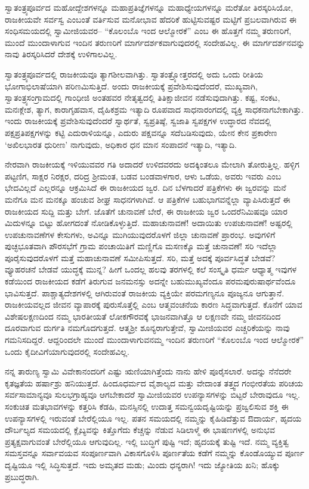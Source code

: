ಸ್ವಾತಂತ್ರ್ಯಪೂರ್ವದ ಮಹೋದ್ದೇಶಗಳನ್ನೂ ಮಹಾಪ್ರತಿಜ್ಞೆಗಳನ್ನೂ ಮಹಾಧ್ಯೇಯಗಳನ್ನೂ ಮರೆತೋ ತಿರಸ್ಕರಿಸಿಯೋ, ರಾಜಕೀಯವೇ ಸರ್ವಸ್ವ ಎಂಬಂತೆ ವರ್ತಿಸುವ ಮನೋಭಾವ ಹೆದರಿಕೆ ಹುಟ್ಟಿಸುವಷ್ಟರ ಮಟ್ಟಿಗೆ ಪ್ರಬಲವಾಗಿರುವ ಈ ಸಂಧಿಸಮಯದಲ್ಲಿ ಸ್ವಾಮೀಜಿಯವರ– “ಕೊಲಂಬೊ ಇಂದ ಆಲ್ಮೋರಕೆ” ಎಂಬ ಈ ಹೊತ್ತಗೆ ನಮ್ಮ ತರುಣರಿಗೆ, ಮುಂದೆ ಮುಂದಾಳಾಗುವ ಇಂದಿನ ತರುಣರಿಗೆ ಮಾರ್ಗದರ್ಶಕವಾಗುವುದರಲ್ಲಿ ಸಂದೇಹವಿಲ್ಲ. ಈ ಮಾರ್ಗದರ್ಶನವನ್ನು ನಾವು ತಿರಸ್ಕರಿಸಿದರೆ ದೇಶಕ್ಕೆ ಉಳಿಗಾಲವಿಲ್ಲ.

ಸ್ವಾತಂತ್ರ್ಯಪೂರ್ವದಲ್ಲಿ ರಾಜಕೀಯವೂ ತ್ಯಾಗಶೀಲವಾಗಿತ್ತು. ಸ್ವಾತಂತ್ರ್ಯೋತ್ತರದಲ್ಲಿ ಅದು ಒಂದು ರೀತಿಯ ಭೋಗಾಭಿಲಾಷೆಯಾಗಿ ಪರಿಣಮಿಸುತ್ತಿದೆ. ಅಂದು ರಾಜಕೀಯಕ್ಕೆ ಪ್ರವೇಶಿಸುವುದೆಂದರೆ, ಮುಖ್ಯವಾಗಿ, ಸ್ವಾತಂತ್ರ್ಯ\break ಸಂಗ್ರಾಮದಲ್ಲಿ ಗಾಂಧೀಜಿ ಅಂತಹವರ ನೇತೃತ್ವದಲ್ಲಿ ತಿತಿಕ್ಷಾಜೀವನ ನಡೆಸುವುದಾಗಿತ್ತು. ಕಷ್ಟ, ಸಂಕಟ, ಮನಃಕ್ಲೇಶ, ತ್ಯಾಗ, ಕಾರಾಗೃಹವಾಸ, ದೈಹಿಕಶ್ರಮ ಇತ್ಯಾದಿ ರೂಪವಾದ ಸಾಧನಾರಂಗದಲ್ಲಿ ವ್ಯಕ್ತಿ ಸಾಧಕನಾಗಬೇಕಾಗಿತ್ತು. ಇಂದು ರಾಜಕೀಯಕ್ಕೆ ಪ್ರವೇಶಿಸುವುದೆಂದರೆ ಸ್ವಾರ್ಥತೆ, ಸ್ವಪ್ರತಿಷ್ಠೆ, ಸ್ವಜಾತಿ ಸ್ವಪಕ್ಷಗಳ ಉದ್ಧಾರದ ನೆವದಲ್ಲಿ ಪಕ್ಷಪ್ರತಿಪಕ್ಷಗಳನ್ನು ಕಟ್ಟಿ ಎದುರಾಳಿಯನ್ನೂ, ಎದುರು ಪಕ್ಷವನ್ನೂ ಸದೆಬಡಿಸುವುದು, ಯೇನ ಕೇನ ಪ್ರಕಾರೇಣ ‘ಅಖಿಲಭಾರತ ಧುರೀಣ’ ನಾಗುವುದು, ಅಧಿಕಾರ ಧನ ಮಾನ ಸಂಪಾದನೆ ಇತ್ಯಾದಿ, ಇತ್ಯಾದಿ.

ನೇರವಾಗಿ ರಾಜಕೀಯಕ್ಕೆ ಇಳಿಯುವವರ ಗತಿ ಅದಾದರೆ ಉಳಿದವರದು ಅದಕ್ಕಿಂತಲೂ ಮೇಲಾಗಿ ತೋರುತ್ತಿಲ್ಲ. ಹಳ್ಳಿಗ ಪಟ್ಟಣಿಗ, ಸಾಕ್ಷರ ನಿರಕ್ಷರ, ದರಿದ್ರ ಶ‍್ರೀಮಂತ, ಬಡವ ಬಂಡವಾಳಗಾರ, ಆಳು ಒಡೆಯ, ಅವರು ಇವರು ಎಂಬ ಭೇದವಿಲ್ಲದೆ ಎಲ್ಲರನ್ನೂ ಆಕ್ರಮಿಸಿದೆ ಈ ರಾಜಕೀಯದ ಜ್ವರ. ದಿನ ಬೆಳಗಾದರೆ ಪತ್ರಿಕೆಗಳು ಈ ಜ್ವರವನ್ನು ಮನೆ ಮನೆಗೂ ಮನ ಮನಕ್ಕೂ ಹಂಚುವ ಶೀಘ್ರ ಸಾಧನಗಳಾಗಿವೆ. ಆ ಪತ್ರಿಕೆಗಳ ಬಹುಭಾಗವನ್ನೆಲ್ಲಾ ವ್ಯಾಪಿಸಿರುತ್ತದೆ ಈ ರಾಜಕೀಯದ ಸುದ್ದಿ ಮತ್ತು ಬೇಗೆ. ಜೊತೆಗೆ ಚುನಾವಣೆ ಬೇರೆ, ಈ ರಾಜಕೀಯ ಜ್ವರ ಒಂದರೆನಿಮಿಷವೂ ಯಾರ ಮಿದುಳನ್ನೂ ಬಿಟ್ಟು ಹೋಗದಂತೆ ನೋಡಿಕೊಳ್ಳುತ್ತಿದೆ. ಮಹಾಚುನಾವಣೆ! ಅದಾಯಿತು ಉಪಚುನಾವಣೆ! ಅಷ್ಟರಲ್ಲಿ ಉಪಚುನಾವಣೆಗಳ ಕೇಸುಗಳು, ಅವಿನ್ನೂ ಮುಗಿಯುವುದರೊಳಗೆ ಜಿಲ್ಲಾ ಚುನಾವಣೆ ಪ್ರಾರಂಭ. ಅವುಗಳಿಗೆ ಪುಚ್ಛಭೂತವಾಗಿ ಪೌರಸಭೆಗೆ ಗ್ರಾಮ ಪಂಚಾಯಿತಿಗೆ ಮಣ್ಣಿಗೊ ಮಸಣಕ್ಕೊ ಮತ್ತೆ ಚುನಾವಣೆ! ಸರಿ ಇದೆಲ್ಲಾ ಪೂರೈಸುವುದರೊಳಗೆ ಮತ್ತೆ ಮಹಾಚುನಾವಣೆ ಸಮೀಪಿಸುತ್ತದೆ. ಸರಿ, ಮತ್ತೆ ಅದಕ್ಕೆ ಪೂರ್ವಸಿದ್ಧತೆ ಬೇಡವೆ? ವ್ಯೂಹರಚನೆ ಬೇಡವೆ ಯುದ್ಧಕ್ಕೆ ಮುನ್ನ? ಹೀಗೆ ಒಂದಲ್ಲ ಹಲವು ತರಗಳಲ್ಲಿ ಕಲೆ ಸಂಸ್ಕೃತಿ ಧರ್ಮ ಆಧ್ಯಾತ್ಮ ಇವುಗಳ ಕಡೆಯಿಂದ ರಾಜಕೀಯದ ಕಡೆಗೆ ತಿರುಗುವ ಜನಮನಸ್ಸು ಅದನ್ನೇ ಬಹುಮುಖ್ಯವೆಂದೂ ಪರಮಪುರುಷಾರ್ಥವೆಂದೂ ಭಾವಿಸುತ್ತದೆ. ಪಾಶ್ಚಾತ್ಯದೇಶಗಳಲ್ಲಿ ಆಗಿರುವಂತೆ ರಾಜಕೀಯ ವ್ಯಕ್ತಿಯೇ ಪರಮಗಣ್ಯನೂ ಪೂಜ್ಯನೂ ಆಗುತ್ತಾನೆ. ರಾಜಕೀಯವಲ್ಲದ ಜೀವನ ವ್ಯಾಪಾರಕ್ಕೆ ಪುರುಸೊತ್ತೆಲ್ಲಿ ಎಂಬ ಆತ್ಮವಂಚನೆಯ ಕಾರಣ ಸಿದ್ಧವಾಗುತ್ತದೆ. ಕೊನೆಗೆ ಯಾವ ವಿಶೇಷಲಕ್ಷಣದಿಂದ ನಮ್ಮ ಭಾರತೀಯತೆ ಲೋಕಗೌರವಕ್ಕೆ ಭಾಜನವಾಗಿತ್ತೊ ಆ ಲಕ್ಷಣವೇ ನಮ್ಮ ಜೀವನದಿಂದ ದೂರವಾಗುವ ದುರ್ಗತಿ ನಮಗೊದಗುತ್ತದೆ. ಆತ್ಮಶ‍್ರೀ ಶೂನ್ಯರಾಗುತ್ತೇವೆ, ಸ್ವಾಮೀಜಿಯವರ ಎಚ್ಚರಿಕೆಯನ್ನು ನಾವು ಗಮನಿಸದಿದ್ದರೆ. ಆದ್ದರಿಂದಲೇ ಮುಂದೆ ಮುಂದಾಳಾಗುವನಮ್ಮ ಇಂದಿನ ತರುಣರಿಗೆ “ಕೊಲಂಬೊ ಇಂದ ಆಲ್ಮೋರಕೆ” ಒಂದು ಕೈದೀವಿಗೆಯಾಗುವುದರಲ್ಲಿ ಸಂದೇಹವಿಲ್ಲ.

ನನ್ನ ತಾರುಣ್ಯ ಸ್ವಾಮಿ ವಿವೇಕಾನಂದರಿಗೆ ಎಷ್ಟು ಋಣಿಯಾಗಿತ್ತೆಂದು ನಾನು ಹೇಳಿ ಪೂರೈಸಲಾರೆ. ಅದನ್ನು ನೆನೆದರೇ ಕೃತಜ್ಞತೆಯ ಹರ್ಷಾಶ್ರು ಹನಿಯುತ್ತದೆ. ಹಿಂದೂಧರ್ಮದ ವೈಶಾಲ್ಯದ ಮತ್ತು ವೇದಾಂತ ತತ್ತ್ವದ ಗಂಭೀರತೆಯ ಪರಿಚಯ ಸರ್ವಸಾಮಾನ್ಯವೂ ಸುಲಭಗ್ರಾಹ್ಯವೂ ಆಗಬೇಕಾದರೆ ಸ್ವಾಮೀಜಿಯವರ ಉಪನ್ಯಾಸಗಳನ್ನು ಬಿಟ್ಟರೆ ಬೇರಾವುದೂ ಇಲ್ಲ. ಸಂಕುಚಿತ ಮತಭಾವಗಳನ್ನು ಕತ್ತರಿಸಿ ಕೆಡಹಿ, ಮನಸ್ಸಿನಲ್ಲಿ ಉದಾತ್ತ ಸಮನ್ವಯ\break ದೃಷ್ಟಿಯನ್ನು ಪ್ರಜ್ವಲಿಸುವ ಶಕ್ತಿ ಈ ಉಪನ್ಯಾಸಗಳಲ್ಲಿ ಇರುವಂತೆ ಬೇರೆಲ್ಲಿಯೂ ಇಲ್ಲ. ಪತನ ಸಮಯದಲ್ಲಿ ನಮ್ಮನ್ನು ಕೈಹಿಡಿದೆತ್ತುವ ಔದಾರ್ಯ, ಹೃದಯ ದೌರ್ಬಲ್ಯದ ಸಮಯದಲ್ಲಿ ಕ್ಲೈಬ್ಯವನ್ನು ಕಿತ್ತೊಗೆದು ಕೆಚ್ಚನ್ನು ನೆಡುವ ಸಿಡಿಲಾಳ್ಮೆ ಈ ಭಾಷಣಗಳಲ್ಲಿ ಅನುಭವ ಪ್ರತ್ಯಕ್ಷವಾಗುವಂತೆ ಬೇರೆಲ್ಲಿಯೂ ಆಗುವುದಿಲ್ಲ. ಇಲ್ಲಿ ಬುದ್ಧಿಗೆ ಪುಷ್ಟಿ ಇದೆ; ಹೃದಯಕ್ಕೆ ತುಷ್ಟಿ ಇದೆ. ನಮ್ಮ ವ್ಯಕ್ತಿತ್ವ ಸಮಸ್ತವನ್ನೂ ಸರ್ವಾವಯವ ಸಂಪೂರ್ಣವಾಗಿ ವಿಕಾಸಗೊಳಿಸಿ ಪೂರ್ಣತೆಯ ಕಡೆಗೆ ನಮ್ಮನ್ನು ಕೊಂಡೊಯ್ಯುವ ಪೂರ್ಣ ದೃಷ್ಟಿಯೂ ಇಲ್ಲಿ ಸಿದ್ಧಿಸುತ್ತದೆ. ಇದು ಅಮೃತದ ಮಡು; ಮಿಂದು ಧನ್ಯರಾಗಿ! ಇದು ಜ್ಯೋತಿಯ ಖನಿ; ಹೊಕ್ಕು ಪ್ರಬುದ್ಧರಾಗಿ.


